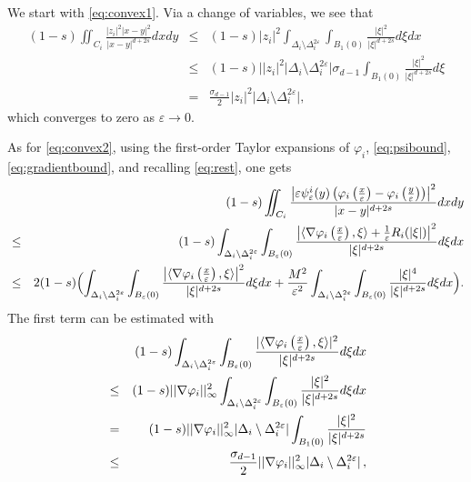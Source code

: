 \documentclass[11pt,a4paper,reqno]{amsart}
\theoremstyle{plain}
\theoremstyle{definition}
\newcommand\e{\varepsilon}
\newcommand\Omid{\Delta_i^{2\varepsilon}}
\theoremstyle{remark}
\begin{document}
We start with \eqref{eq:convex1}. Via a change of variables, we see that  
\begin{eqnarray*}\nonumber
  (1-s)\iint_{C_i}\frac{ \lvert z_i\rvert^2\lvert x-y\rvert^2}{\lvert x-y\rvert^{d+2s}}dxdy &\leq& (1-s)\lvert z_i\rvert^2\int_{\Delta_i\setminus{\Omid}}\int_{B_{1}(0)}\frac{\lvert\xi\rvert^2}{\lvert\xi\rvert^{d+2s}}d\xi dx\\
   &\leq&
    (1-s)\rvert\lvert z_i\rvert^2\lvert\Delta_i\setminus{\Omid}\rvert \sigma_{d-1}\int_{B_{1}(0)}\frac{\lvert\xi\rvert^2}{\lvert\xi\rvert^{d+2s}}d\xi \label{eq:radialintegral}\\&=&\frac{\sigma_{d-1}}{2}\lvert z_i\rvert^2\lvert\Delta_i\setminus{\Omid}\rvert,
\end{eqnarray*}
which converges to zero as $\e\to 0$. 

As for \eqref{eq:convex2}, using the first-order Taylor expansions of $\varphi_i$, \eqref{eq:psibound}, \eqref{eq:gradientbound}, and recalling \eqref{eq:rest}, one gets
\begin{eqnarray*}\nonumber
&&\hspace{-0.7cm}(1-s)\iint_{C_i}\frac{\left\lvert\e\psi^i_\e(y)\left(\varphi_i\left(\frac{x}{\e}\right)-\varphi_i\left(\frac{y}{\e}\right)\right)\right\rvert^2}{\lvert x-y\rvert^{d+2s}}dxdy\\ 
&\leq& (1-s)\int_{\Delta_i\setminus{\Omid}}\int_{B_{\e}(0)}\frac{\left\lvert\langle\nabla{\varphi_i}\left(\frac{x}{\e}\right),\xi\rangle+\frac{1}{\e}R_i(|\xi|)\right\rvert^2}{\lvert \xi\rvert^{d+2s}}d\xi dx \\ \label{eq:sommaconO}\hspace{-0.7cm}&\leq&
2(1-s)\Bigl(\int_{\Delta_i\setminus{\Omid}}\int_{B_{\e}(0)}\frac{\left\lvert \langle\nabla{\varphi_i}\left(\frac{x}{\e}\right),\xi\rangle\right\rvert^2}{\lvert \xi\rvert^{d+2s}}d\xi dx+\frac{M^2}{\e^2}\int_{\Delta_i\setminus{\Omid}}\int_{B_{\e}(0)}\frac{\lvert\xi\rvert^4}{\lvert \xi\rvert^{d+2s}}d\xi dx\Bigr).
\end{eqnarray*}
The first term can be estimated with 
\begin{eqnarray*}
 &&\hskip-2cm(1-s)\int_{\Delta_i\setminus{\Omid}}\int_{B_{\e}(0)}\frac{\lvert\langle\nabla{\varphi_i}\left(\frac{x}{\e}\right),\xi\rangle\rvert^2}{\lvert \xi\rvert^{d+2s}}d\xi dx\\  \nonumber
&\leq& (1-s)\lvert\lvert \nabla{\varphi_i}\rvert\rvert_\infty^2\int_{\Delta_i\setminus{\Omid}}\int_{B_{\e}(0)}\frac{\lvert\xi\rvert^2}{\lvert \xi\rvert^{d+2s}}d\xi dx\\ \nonumber
&=& (1-s)\lvert\lvert \nabla{\varphi_i}\rvert\rvert_\infty^2\lvert\Delta_i\setminus\Omid\rvert\int_{B_1(0)}\frac{|\xi|^2}{|\xi|^{d+2s}} \\ \nonumber 
&\leq& \frac{\sigma_{d-1}}{2}\lvert\lvert\nabla{\varphi_i}\rvert\rvert_\infty^2|\Delta_i\setminus\Omid|\,,
\end{eqnarray*}
\end{document}
